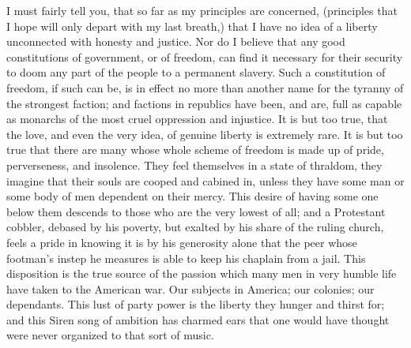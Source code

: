 I must fairly tell you, that so far as my principles are concerned, (principles that I hope will only depart with my last breath,) that I have no idea of a liberty unconnected with honesty and justice. Nor do I believe that any good constitutions of government, or of freedom, can find it necessary for their security to doom any part of the people to a permanent slavery. Such a constitution of freedom, if such can be, is in effect no more than another name for the tyranny of the strongest faction; and factions in republics have been, and are, full as capable as monarchs of the most cruel oppression and injustice. It is but too true, that the love, and even the very idea, of genuine liberty is extremely rare. It is but too true that there are many whose whole scheme of freedom is made up of pride, perverseness, and insolence. They feel themselves in a state of thraldom, they imagine that their souls are cooped and cabined in, unless they have some man or some body of men dependent on their mercy. This desire of having some one below them descends to those who are the very lowest of all; and a Protestant cobbler, debased by his poverty, but exalted by his share of the ruling church, feels a pride in knowing it is by his generosity alone that the peer whose footman's instep he measures is able to keep his chaplain from a jail. This disposition is the true source of the passion which many men in very humble life have taken to the American war. Our subjects in America; our colonies; our dependants. This lust of party power is the liberty they hunger and thirst for; and this Siren song of ambition has charmed ears that one would have thought were never organized to that sort of music.

